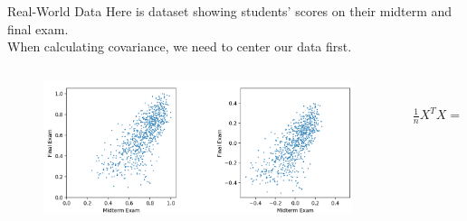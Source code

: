 \documentclass[aspectratio=169]{../latex_main/tntbeamer}  %
\begin{document}
	\begin{frame}{Real-World Data}
	    Here is dataset showing students’ scores on their midterm and final exam.\\
	    When calculating covariance, we need to center our data first.
	    \begin{columns}
	        \begin{column}{.5\textwidth}
	                \begin{figure}
	                    \centering
	                    \includegraphics[scale=.35]{Bild2}
	                \end{figure}
	        \end{column}
	        
	        
	        \begin{column}{.5\textwidth}
	                \\
	                \bigskip
	                \bigskip
	                \begin{align*}
	                     \frac{1}{n}X^TX =
	                \left[\begin{array}{cc}
	                    .022 & .021 \\
	                   .021  & .037
	                \end{array}\right]
	                \end{align*}
	        \end{column}
	    \end{columns}
	\end{frame}
\end{document}
